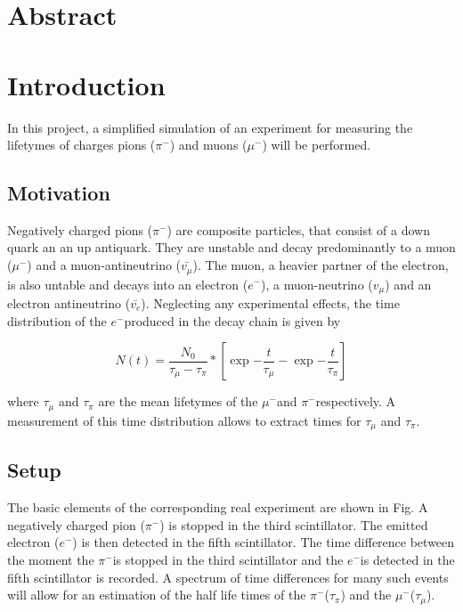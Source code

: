 \documentclass[11pt, a4paper, oneside]{book}
\newcommand{\electron}{$e^{-}$}
\newcommand{\pion}{$\pi^{-}$}
\newcommand{\muon}{$\mu^{-}$}
\begin{document}

\frontmatter

\tableofcontents
\mainmatter

\chapter{Abstract}

\chapter{Introduction}
In this project, a simplified simulation of an experiment for measuring the lifetymes of charges pions (\pion) and muons (\muon) will be performed.

\section{Motivation}
Negatively charged pions (\pion) are composite particles, that consist of a down quark an an up antiquark. They are unstable and decay predominantly to a muon (\muon) and a muon-antineutrino ($\bar{v_{\mu}}$). The muon, a heavier partner of the electron, is also untable and decays into an electron (\electron), a muon-neutrino ($v_{\mu}$) and an electron antineutrino ($\bar{v_{e}}$). Neglecting any experimental effects, the time distribution of the \electron produced in the decay chain is given by

\begin{equation}
    N(t) = \frac{N_0}{\tau_{\mu} - \tau_{\pi}} * [\exp{-\frac{t}{\tau_{\mu}}} - \exp{-\frac{t}{\tau_{\pi}}}]
    \label{eq:decay_chain_equation}
\end{equation}

where $\tau_{\mu}$ and $\tau_{\pi}$ are the mean lifetymes of the \muon and \pion respectively. A measurement of this time distribution allows to extract times for $\tau_{\mu}$ and $\tau_{\pi}$.

\section{Setup}

The basic elements of the corresponding real experiment are shown in Fig. A negatively charged pion (\pion) is stopped in the third scintillator. The emitted electron (\electron) is then detected in the fifth scintillator. The time difference between the moment the \pion is stopped in the third scintillator and the \electron is detected in the fifth scintillator is recorded. A spectrum of time differences for many such events will allow for an estimation of the half life times of the \pion ($\tau_{\pi}$) and the \muon ($\tau_{\mu}$).
\end{document}
